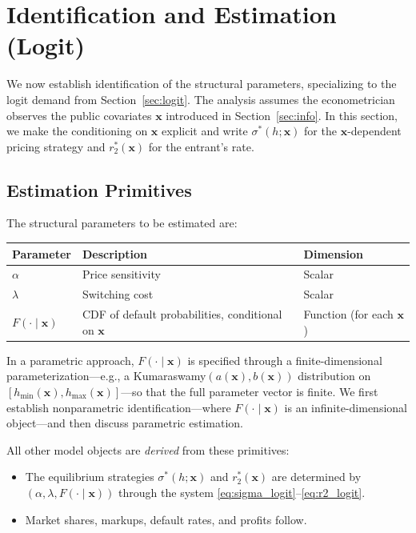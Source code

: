 \documentclass[12pt]{article}
\theoremstyle{plain}
\theoremstyle{plain}
\theoremstyle{definition}  %
\theoremstyle{remark}  %
\begin{document}
\newpage
\section{Identification and Estimation (Logit)}
\label{sec:id}

We now establish identification of the structural parameters, specializing to the logit demand from Section~\ref{sec:logit}. The analysis assumes the econometrician observes the public covariates $\mathbf{x}$ introduced in Section~\ref{sec:info}. In this section, we make the conditioning on $\mathbf{x}$ explicit and write $\sigma^*(h;\mathbf{x})$ for the $\mathbf{x}$-dependent pricing strategy and $r_2^*(\mathbf{x})$ for the entrant's rate.

\subsection{Estimation Primitives}\label{sec:primitives}

The structural parameters to be estimated are:

\begin{center}
\renewcommand{\arraystretch}{1.3}
\begin{tabular}{lll}
\toprule
\textbf{Parameter} & \textbf{Description} & \textbf{Dimension} \\
\midrule
$\alpha$ & Price sensitivity & Scalar \\
$\lambda$ & Switching cost & Scalar \\
$F(\cdot \mid \mathbf{x})$ & CDF of default probabilities, conditional on $\mathbf{x}$ & Function (for each $\mathbf{x}$) \\
\bottomrule
\end{tabular}
\end{center}

\medskip\noindent
In a parametric approach, $F(\cdot \mid \mathbf{x})$ is specified through a finite-dimensional parameterization---e.g., a Kumaraswamy$(a(\mathbf{x}), b(\mathbf{x}))$ distribution on $[h_{\min}(\mathbf{x}), h_{\max}(\mathbf{x})]$---so that the full parameter vector is finite. We first establish nonparametric identification---where $F(\cdot \mid \mathbf{x})$ is an infinite-dimensional object---and then discuss parametric estimation.

\medskip\noindent
All other model objects are \emph{derived} from these primitives:
\begin{itemize}
    \item The equilibrium strategies $\sigma^*(h; \mathbf{x})$ and $r_2^*(\mathbf{x})$ are determined by $(\alpha, \lambda, F(\cdot \mid \mathbf{x}))$ through the system \eqref{eq:sigma_logit}--\eqref{eq:r2_logit}.
    \item Market shares, markups, default rates, and profits follow.
\end{itemize}
\end{document}
